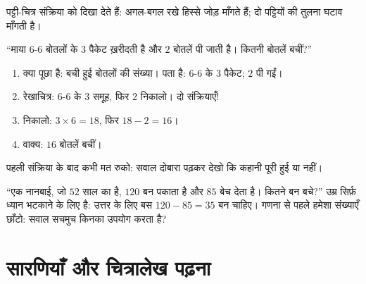 \begin{omfigure}

{\small पट्टी-चित्र संक्रिया को दिखा देते हैं: अगल-बगल रखे
हिस्से जोड़ माँगते हैं; दो पट्टियों की तुलना घटाव माँगती है।}
\end{omfigure}

\begin{example}\label{ex:g3:problems:twostep}
``माया $6$-$6$ बोतलों के $3$ पैकेट ख़रीदती है और $2$ बोतलें पी
जाती है। कितनी बोतलें बचीं?''
\begin{enumerate}
  \item क्या पूछा है: बची हुई बोतलों की संख्या। पता है: $6$-$6$
        के $3$ पैकेट; $2$ पी गईं।
  \item रेखाचित्र: $6$-$6$ के $3$ समूह, फिर $2$ निकालो। दो
        संक्रियाएँ!
  \item निकालो: $3 \times 6 = 18$, फिर $18 - 2 = 16$।
  \item वाक्य: $16$ बोतलें बचीं।
\end{enumerate}
पहली संक्रिया के बाद कभी मत रुको: सवाल दोबारा पढ़कर देखो कि
कहानी पूरी हुई या नहीं।
\end{example}

\begin{example}[एक बेकार संख्या]\label{ex:g3:problems:trap}
``एक नानबाई, जो $52$ साल का है, $120$ बन पकाता है और $85$ बेच
देता है। कितने बन बचे?'' उम्र सिर्फ़ ध्यान भटकाने के लिए है:
उत्तर के लिए बस $120 - 85 = 35$ बन चाहिए। गणना से पहले हमेशा
संख्याएँ छाँटो: सवाल सचमुच किनका उपयोग करता है?
\end{example}

\section{सारणियाँ और चित्रालेख पढ़ना}

